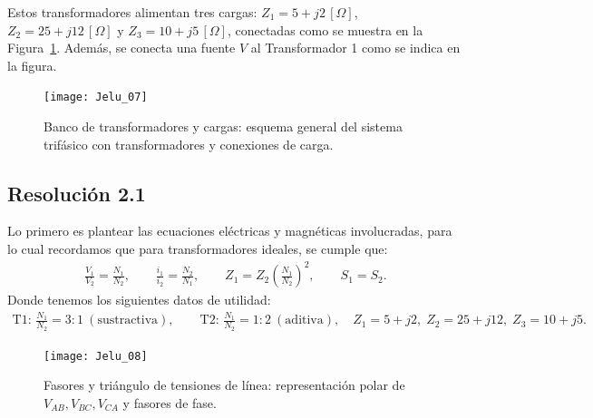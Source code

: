 \documentclass[
  11pt,
  letterpaper,
   addpoints,
  ]{exam}
\begin{document}
\begin{questions}
Estos transformadores alimentan tres cargas:
\(Z_1 = 5 + j2\,[\Omega]\), \(Z_2 = 25 + j12\,[\Omega]\) y \(Z_3 = 10 + j5\,[\Omega]\),
conectadas como se muestra en la Figura~\ref{fig:trafos}. Además, se conecta una
fuente \(V\) al Transformador 1 como se indica en la figura.

\begin{figure}[H]
  \centering
    \texttt{[image: Jelu\_07]}
    \caption{Banco de transformadores y cargas: esquema general del sistema trifásico con transformadores y conexiones de carga.}
  \label{fig:trafos}
\end{figure}

\begin{solution}

\subsection*{Resolución 2.1}
Lo primero es plantear las ecuaciones eléctricas y magnéticas involucradas, para
lo cual recordamos que para transformadores ideales, se cumple que:
\begin{align}
\frac{V_1}{V_2}=\frac{N_1}{N_2},\qquad
\frac{i_1}{i_2}=\frac{N_2}{N_1},\qquad
Z_1 = Z_2\left(\frac{N_1}{N_2}\right)^{\!2},\qquad
S_1=S_2.
\end{align}
Donde tenemos los siguientes datos de utilidad:
\begin{align}
\text{T1: } \frac{N_1}{N_2}=3{:}1\ (\text{sustractiva}),\qquad
\text{T2: } \frac{N_1}{N_2}=1{:}2\ (\text{aditiva}),
\quad Z_1=5+j2,\; Z_2=25+j12,\; Z_3=10+j5.
\end{align}
\begin{figure}[H]
  \centering
  \texttt{[image: Jelu\_08]}
  \caption{Fasores y triángulo de tensiones de línea: representación polar de $V_{AB},V_{BC},V_{CA}$ y fasores de fase.}
\end{figure}


\end{solution}
\end{questions}
\end{document}
